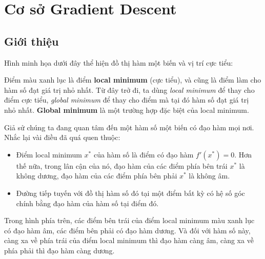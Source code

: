 \section{Cơ sở Gradient Descent}
\label{sec:gd-part1}

\subsection{Giới thiệu}

\begin{ynghia}[title={Bề mặt hàm số và cực tiểu}]
Hình minh họa dưới đây thể hiện đồ thị hàm một biến và vị trí cực tiểu:


Điểm màu xanh lục là điểm \textbf{local minimum} (cực tiểu), và cũng là điểm làm cho hàm số đạt giá trị nhỏ nhất. Từ đây trở đi, ta dùng \emph{local minimum} để thay cho điểm cực tiểu, \emph{global minimum} để thay cho điểm mà tại đó hàm số đạt giá trị nhỏ nhất. \textbf{Global minimum} là một trường hợp đặc biệt của local minimum.
\end{ynghia}

\begin{dinhnghia}[title={Local minimum và đạo hàm}]
Giả sử chúng ta đang quan tâm đến một hàm số một biến có đạo hàm mọi nơi. Nhắc lại vài điều đã quá quen thuộc:
\begin{itemize}
\item Điểm local minimum $x^*$ của hàm số là điểm có đạo hàm $f'(x^*) =0$. Hơn thế nữa, trong lân cận của nó, đạo hàm của các điểm phía bên trái $x^*$ là không dương, đạo hàm của các điểm phía bên phải $x^*$ là không âm.
\item Đường tiếp tuyến với đồ thị hàm số đó tại một điểm bất kỳ có hệ số góc chính bằng đạo hàm của hàm số tại điểm đó.
\end{itemize}
\end{dinhnghia}

\begin{tinhchat}[title={Dấu đạo hàm quanh cực tiểu}]
Trong hình phía trên, các điểm bên trái của điểm local minimum màu xanh lục có đạo hàm âm, các điểm bên phải có đạo hàm dương. Và đối với hàm số này, càng xa về phía trái của điểm local minimum thì đạo hàm càng âm, càng xa về phía phải thì đạo hàm càng dương.
\end{tinhchat}


